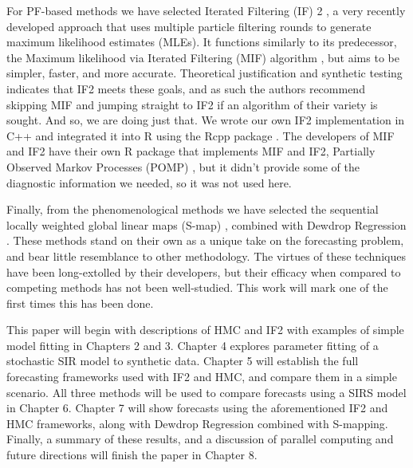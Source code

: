 For PF-based methods we have selected Iterated Filtering (IF) 2 \cite{Ionides2015}, a very recently developed approach that uses multiple particle filtering rounds to generate maximum likelihood estimates (MLEs). It functions similarly to its predecessor, the Maximum likelihood via Iterated Filtering (MIF) algorithm \cite{Ionides2006}, but aims to be simpler, faster, and more accurate. Theoretical justification and synthetic testing indicates that IF2 meets these goals, and as such the authors recommend skipping MIF and jumping straight to IF2 if an algorithm of their variety is sought. And so, we are doing just that. We wrote our own IF2 implementation in C++ and integrated it into R using the Rcpp package \cite{Eddelbuettel2011}. The developers of MIF and IF2 have their own R package that implements MIF and IF2, Partially Observed Markov Processes (POMP) \cite{King2015a}\cite{King2016}, but it didn't provide some of the diagnostic information we needed, so it was not used here.

Finally, from the phenomenological methods we have selected the sequential locally weighted global linear maps (S-map) \cite{Glaser2014}\cite{Hsieh2008}\cite{Sugihara1990}\cite{Sugihara1994}, combined with Dewdrop Regression \cite{Glaser2014}. These methods stand on their own as a unique take on the forecasting problem, and bear little resemblance to other methodology. The virtues of these techniques have been long-extolled by their developers, but their efficacy when compared to competing methods has not been well-studied. This work will mark one of the first times this has been done.

This paper will begin with descriptions of HMC and IF2 with examples of simple model fitting in Chapters 2 and 3. Chapter 4 explores parameter fitting of a stochastic SIR model to synthetic data. Chapter 5 will establish the full forecasting frameworks used with IF2 and HMC, and compare them in a simple scenario. All three methods will be used to compare forecasts using a SIRS model in Chapter 6. Chapter 7 will show forecasts using the aforementioned IF2 and HMC frameworks, along with Dewdrop Regression combined with S-mapping. Finally, a summary of these results, and a discussion of parallel computing and future directions will finish the paper in Chapter 8.